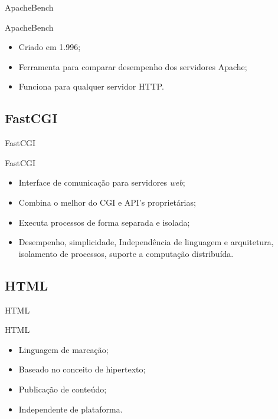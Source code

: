 \begin{frame}{ApacheBench}
	\begin{block}{ApacheBench}
	\begin{itemize}
		\item Criado em 1.996;
		\item Ferramenta para comparar desempenho dos servidores Apache;
		\item Funciona para qualquer servidor HTTP.
	\end{itemize}
\end{block}
\end{frame}

\subsection*{FastCGI}

\begin{frame}{FastCGI}
	\begin{block}{FastCGI}
	\begin{itemize}
		\item Interface de comunicação para servidores \textit{web};
		\item Combina o melhor do CGI e API's proprietárias;
		\item Executa processos de forma separada e isolada;
		\item Desempenho, simplicidade, Independência de linguagem e 
		arquitetura, isolamento de processos, suporte a computação distribuída.
	\end{itemize}
\end{block}
\end{frame}

\subsection*{HTML}

\begin{frame}{HTML}
	\begin{block}{HTML}
	\begin{itemize}
		\item Linguagem de marcação;
		\item Baseado no conceito de hipertexto;
		\item Publicação de conteúdo;
		\item Independente de plataforma.
	\end{itemize}
\end{block}
\end{frame}

